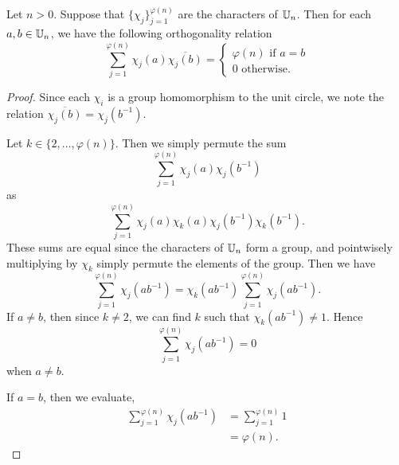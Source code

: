 \documentclass{unswmaths}
\begin{document}
    \begin{lemma}
        \label{charOrth}
        Let $n > 0$. Suppose that $\{\chi_j\}_{j=1}^{\varphi(n)}$ are the characters
        of $\mathbb{U}_n$. Then for each $a,b\in \mathbb{U}_n$, we have the following orthogonality
        relation
        \begin{equation*}
            \sum_{j=1}^{\varphi(n)} \chi_j(a)\overline{\chi_j(b)} = \begin{cases}
                \varphi(n)\text{ if }a = b\\
                0\text{ otherwise.}
            \end{cases}
        \end{equation*}
    \end{lemma}
    \begin{proof}
        Since each $\chi_i$ is a group homomorphism to the unit circle,
        we note the relation $\overline{\chi_j(b)} = \chi_j(b^{-1})$. 
        
        Let $k \in \{2,\ldots,\varphi(n)\}$. Then we simply permute
        the sum
        \begin{equation*}
            \sum_{j=1}^{\varphi(n)} \chi_j(a)\chi_j(b^{-1})
        \end{equation*}
        as
        \begin{equation*}
            \sum_{j=1}^{\varphi(n)} \chi_j(a)\chi_k(a)\chi_j(b^{-1})\chi_{k}(b^{-1}).
        \end{equation*}
        These sums are equal since the characters of $\mathbb{U}_n$ form a group, and pointwisely
        multiplying by $\chi_k$ simply permute the elements of the group. Then we have
        \begin{equation*}
            \sum_{j=1}^{\varphi(n)} \chi_j(ab^{-1}) = \chi_k(ab^{-1})\sum_{j=1}^{\varphi(n)} \chi_j(ab^{-1}).
        \end{equation*}
        If $a \neq b$, then since $k \neq 2$, we can find $k$ such that $\chi_k(ab^{-1}) \neq 1$. Hence
        \begin{equation*}
            \sum_{j=1}^{\varphi(n)} \chi_j(ab^{-1}) = 0
        \end{equation*}
        when $a\neq b$.
        
        If $a = b$, then we evaluate,
        \begin{align*}
            \sum_{j=1}^{\varphi(n)} \chi_j(ab^{-1}) &= \sum_{j=1}^{\varphi(n)} 1\\
            &= \varphi(n).
        \end{align*}
    \end{proof}
\end{document}
